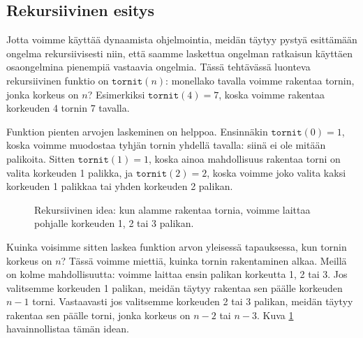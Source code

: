 \subsection{Rekursiivinen esitys}

Jotta voimme käyttää dynaamista ohjelmointia,
meidän täytyy pystyä esit\-tämään ongelma rekursiivisesti
niin, että saamme laskettua ongelman ratkaisun
käyttäen osaongelmina pienempiä vastaavia ongelmia.
Tässä tehtävässä luonteva rekursiivinen funktio on
$\texttt{tornit}(n)$: monellako tavalla voimme
rakentaa tornin, jonka korkeus on $n$?
Esimerkiksi $\texttt{tornit}(4)=7$, koska
voimme rakentaa korkeuden 4 tornin 7 tavalla.

Funktion pienten arvojen laskeminen on helppoa.
Ensinnäkin $\texttt{tornit}(0)=1$, koska voimme
muodostaa tyhjän tornin yhdellä tavalla:
siinä ei ole mitään palikoita.
Sitten $\texttt{tornit}(1)=1$, koska ainoa mahdollisuus
rakentaa torni on valita korkeuden 1 palikka,
ja $\texttt{tornit}(2)=2$, koska voimme joko valita
kaksi korkeuden 1 palikkaa tai yhden korkeuden 2 palikan.

\begin{figure}
\center
{}
\caption{Rekursiivinen idea: kun alamme rakentaa tornia, voimme laittaa pohjalle
korkeuden 1, 2 tai 3 palikan.}
\label{fig:dynrek}
\end{figure}

Kuinka voisimme sitten laskea funktion arvon yleisessä tapauksessa,
kun tornin korkeus on $n$?
Tässä voimme miettiä, kuinka tornin rakentaminen alkaa.
Meillä on kolme mahdollisuutta: voimme laittaa ensin palikan
korkeutta 1, 2 tai 3.
Jos valitsemme korkeuden 1 palikan, meidän täytyy rakentaa
sen päälle korkeuden $n-1$ torni.
Vastaavasti jos valitsemme korkeuden 2 tai 3 palikan,
meidän täytyy rakentaa sen päälle torni,
jonka korkeus on $n-2$ tai $n-3$.
Kuva \ref{fig:dynrek} havainnollistaa tämän idean.

